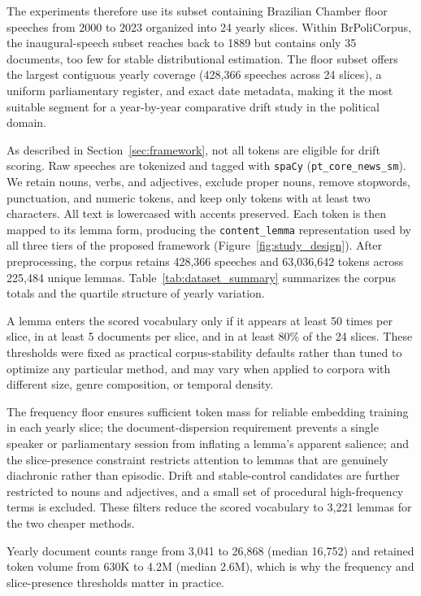 \documentclass[12pt]{article}
\begin{document}
The experiments therefore use its subset containing Brazilian Chamber floor
speeches from 2000 to 2023 organized into 24 yearly slices. Within
BrPoliCorpus, the inaugural-speech subset reaches back to 1889 but
contains only 35 documents, too few for stable distributional estimation. The
floor subset offers the largest contiguous yearly coverage (428{,}366 speeches
across 24 slices), a uniform parliamentary register, and exact date metadata,
making it the most suitable segment for a year-by-year comparative drift study
in the political domain.

As described in Section~\ref{sec:framework}, not all tokens are eligible for drift scoring. Raw speeches are tokenized and tagged with
\texttt{spaCy} (\texttt{pt\_core\_news\_sm}). We retain nouns, verbs, and
adjectives, exclude proper nouns, remove stopwords, punctuation, and numeric
tokens, and keep only tokens with at least two characters. All text is
lowercased with accents preserved. Each token is then mapped to its lemma form,
producing the \texttt{content\_lemma} representation used by all three tiers of the proposed framework (Figure~\ref{fig:study_design}).
After preprocessing, the corpus retains 428{,}366 speeches and
63{,}036{,}642 tokens across 225{,}484 unique lemmas.
Table~\ref{tab:dataset_summary} summarizes the corpus totals and the quartile
structure of yearly variation.

A lemma enters the scored vocabulary only if it appears at least 50 times per
slice, in at least 5 documents per slice, and in at least 80\% of the 24
slices. These thresholds were fixed as practical corpus-stability defaults
rather than tuned to optimize any particular method, and may vary when applied to corpora with different size, genre composition, or temporal density. 

The frequency floor
ensures sufficient token mass for reliable embedding training in each yearly
slice; the document-dispersion requirement prevents a single speaker or
parliamentary session from inflating a lemma's apparent salience; and the
slice-presence constraint restricts attention to lemmas that are genuinely
diachronic rather than episodic. Drift and stable-control candidates are
further restricted to nouns and adjectives, and a small set of procedural
high-frequency terms is excluded. These filters reduce the scored vocabulary
to 3{,}221 lemmas for the two cheaper methods.

Yearly document counts range from 3{,}041 to 26{,}868 (median 16{,}752) and retained token volume from 630K to 4.2M (median 2.6M), which is why the frequency and slice-presence thresholds matter in practice.
\end{document}
